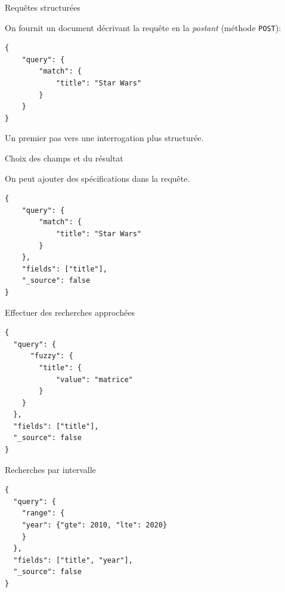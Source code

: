 \begin{frame}[fragile]{Requêtes structurées}

On fournit un document décrivant la requête en la \textit{postant}  
(méthode \texttt{POST}):

\vfill

\begin{verbatim}
{
    "query": {
      	"match": {
        	"title": "Star Wars"
      	}
  	}
}
\end{verbatim}

\vfill

Un premier pas vers une interrogation plus structurée.

\end{frame}

\begin{frame}[fragile]{Choix des champs et du résultat}

On peut ajouter des spécifications dans la requête.

\vfill

\begin{verbatim}
{
    "query": {
      	"match": {
        	"title": "Star Wars"
      	}
  	},
  	"fields": ["title"],
  	"_source": false
}
\end{verbatim}

\end{frame}

\begin{frame}[fragile]{Effectuer des recherches approchées}

\begin{verbatim}
{
  "query": {
	  "fuzzy": {
      	"title": {
        	"value": "matrice"
    	}
    }
  },
  "fields": ["title"],
  "_source": false
}
\end{verbatim}

\end{frame}


\begin{frame}[fragile]{Recherches par intervalle}

\begin{verbatim}
{
  "query": {
	"range": {
	"year": {"gte": 2010, "lte": 2020}
    }
  },
  "fields": ["title", "year"],
  "_source": false
}
\end{verbatim}

\end{frame}






